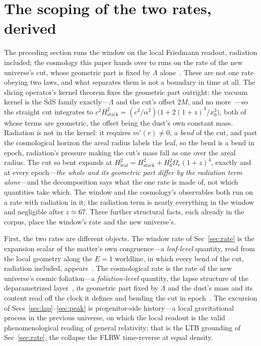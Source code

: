 \documentclass[11pt,a4paper]{article}
\theoremstyle{plain}
\theoremstyle{definition}
\theoremstyle{remark}
\begin{document}
\section{The scoping of the two rates, derived}\label{sec:scoping}
The preceding section runs the window on the local Friedmann readout, radiation included; the
cosmology this paper hands over to runs on the rate of the new universe's cut, whose geometric part is fixed by
$\Lambda$ alone~\cite{JanzenCRcosmology}. These are not one rate obeying two laws, and what separates
them is not a boundary in time at all. The slicing operator's kernel theorem fixes the geometric part
outright: the vacuum kernel is the SdS family exactly---$\Lambda$ and the cut's offset $2M$, and no
more~\cite{JanzenOperator}---so the straight cut integrates to
$c^{2}H_{\text{stack}}^{2}=(c^{2}/\alpha^{2})\big(1+2(1+z)^{3}/x_0^{3}\big)$, both of whose terms are
geometric, the offset being the dust's own constant mass. Radiation is not in the kernel: it requires
$m'(r)\neq0$, a \emph{bend} of the cut, and past the cosmological horizon the areal radius labels the leaf, so
the bend is a bend in epoch, radiation's pressure making the cut's mass fall as one over the areal radius. The
cut so bent expands at
$H_{\text{leaf}}^{2}=H_{\text{stack}}^{2}+H_0^{2}\Omega_r(1+z)^{4}$, exactly and at every epoch---\emph{the
whole and its geometric part differ by the radiation term alone}---and the decomposition says what the one rate
is made of, not which quantities take which. The window and the cosmology's observables both run on a rate
with radiation in it; the radiation term is nearly everything in the window and negligible after $z\simeq67$.
Three further structural facts, each already in the corpus, place the window's rate and the new universe's.

First, the two rates are different objects. The window rate of Sec~\ref{sec:rate} is the
expansion scalar of the matter's own congruence---a \emph{leaf-level} quantity, read from the
local geometry along the $E=1$ worldline, in which every bend of the cut, radiation included,
appears~\cite{JanzenOperator}. The cosmological rate is the rate of the new universe's
cosmic foliation---a \emph{foliation-level} quantity, the lapse structure of the deparametrized
layer~\cite{JanzenCanonicalTime}, its geometric part fixed by $\Lambda$ and the dust's mass and its content
read off the clock it defines and bending the cut in epoch~\cite{JanzenCRcosmology}. The excursion of Secs~\ref{sec:lap}--\ref{sec:peak} is
progenitor-side history---a local gravitational process in the previous universe, on which the
local readout is the valid phenomenological reading of general relativity; that is the LTB
grounding of Sec~\ref{sec:rate}, the collapse the FLRW time-reverse at equal density.
\end{document}
